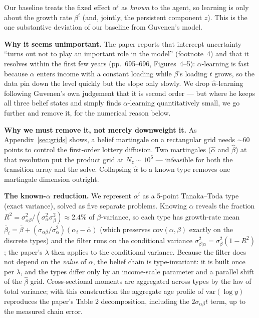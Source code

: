\documentclass[11pt,fleqn]{article}
\begin{document}
Our baseline treats the fixed effect $\alpha^i$ as \emph{known} to the agent, so learning
is only about the growth rate $\beta^i$ (and, jointly, the persistent component $z$).
This is the one substantive deviation of our baseline from Guvenen's model.

\textbf{Why it seems unimportant.} The paper reports that intercept uncertainty ``turns
out not to play an important role in the model'' (footnote~4) and that it resolves within
the first few years (pp.~695--696, Figures~4--5): $\alpha$-learning is fast because
$\alpha$ enters income with a constant loading while $\beta$'s loading $t$ grows, so the
data pin down the level quickly but the slope only slowly. We drop $\hat\alpha$-learning
following Guvenen's own judgement that it is second order --- but where he keeps all three
belief states and simply finds $\alpha$-learning quantitatively small, we go further and
remove it, for the numerical reason below.

\textbf{Why we must remove it, not merely downweight it.} As Appendix~\ref{sec:grids}
shows, a belief martingale on a rectangular grid needs $\sim$60 points to control the
first-order lottery diffusion. Two martingales ($\hat\alpha$ and $\hat\beta$) at that
resolution put the product grid at $N_z\sim10^6$ --- infeasible for both the transition
array and the solve. Collapsing $\hat\alpha$ to a known type removes one martingale
dimension outright.

\textbf{The known-$\alpha$ reduction.} We represent $\alpha^i$ as a 5-point Tanaka--Toda
type (exact variance), solved as five separate problems. Knowing $\alpha$ reveals the
fraction $R^2=\sigma_{\alpha\beta}^2/(\sigma^2_\alpha\sigma^2_\beta)\approx2.4\%$ of
$\beta$-variance, so each type has growth-rate mean
$\bar\beta_i=\bar\beta+(\sigma_{\alpha\beta}/\sigma^2_\alpha)(\alpha_i-\bar\alpha)$
(which preserves $\mathrm{cov}(\alpha,\beta)$ exactly on the discrete types) and the
filter runs on the conditional variance
$\sigma^2_{\beta|\alpha}=\sigma^2_\beta(1-R^2)$; the paper's $\lambda$ then applies to the
conditional variance. Because the filter does not depend on the \emph{value} of $\alpha$,
the belief chain is type-invariant: it is built once per $\lambda$, and the types differ
only by an income-scale parameter and a parallel shift of the $\hat\beta$ grid.
Cross-sectional moments are aggregated across types by the law of total variance; with
this construction the aggregate age profile of $\mathrm{var}(\log y)$ reproduces the
paper's Table 2 decomposition, including the $2\sigma_{\alpha\beta}t$ term, up to the
measured chain error.
\end{document}
